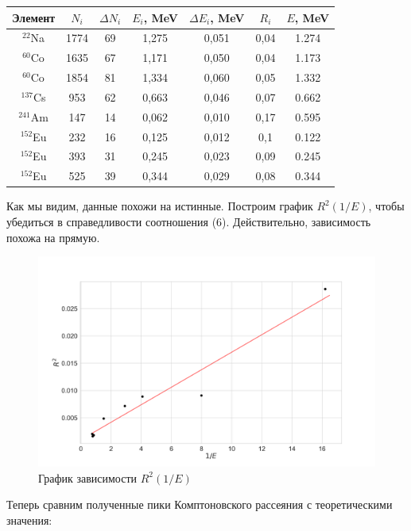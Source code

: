 \documentclass[a4paper, 12pt]{article}
\begin{document}
\begin{table}[H]
	\centering
	\begin{tabular}{|c|c|c|c|c|c|c|}
	\hline
	Элемент    & $N_i$ & $\Delta N_i$ & $E_i$, MeV & $\Delta E_i$, MeV & $R_i$ & $E$, MeV \\ \hline
	$^{22}$Na  & 1774  & 69           & 1,275      & 0,051             & 0,04  & 1.274    \\ \hline
	$^{60}$Co  & 1635  & 67           & 1,171      & 0,050             & 0,04  & 1.173    \\ \hline
	$^{60}$Co  & 1854  & 81           & 1,334      & 0,060             & 0,05  & 1.332    \\ \hline
	$^{137}$Cs & 953   & 62           & 0,663      & 0,046             & 0,07  & 0.662    \\ \hline
	$^{241}$Am & 147   & 14           & 0,062      & 0,010             & 0,17  & 0.595    \\ \hline
	$^{152}$Eu & 232   & 16           & 0,125      & 0,012             & 0,1   & 0.122    \\ \hline
	$^{152}$Eu & 393   & 31           & 0,245      & 0,023             & 0,09  & 0.245    \\ \hline
	$^{152}$Eu & 525   & 39           & 0,344      & 0,029             & 0,08  & 0.344    \\ \hline
	\end{tabular}
	\end{table}
Как мы видим, данные похожи на истинные. Построим график $R^2(1/E)$, чтобы убедиться в справедливости соотношения (6). Действительно, зависимость похожа на прямую.
\begin{figure}[H]
	\centering
	\includegraphics[width=1\textwidth]{plotr2.png}  \caption{График зависимости $R^2(1/E)$}
	\label{fig:plotr2}
\end{figure}
Теперь сравним полученные пики Комптоновского рассеяния с теоретическими значения:
\end{document}
